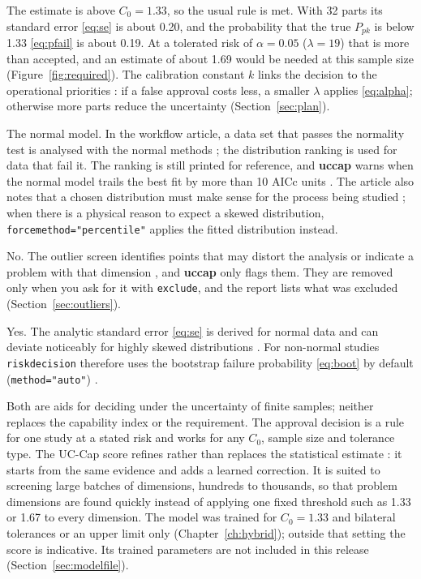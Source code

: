 \documentclass[a4paper,11pt,oneside,openany,parskip=half-,headings=standardclasses,toc=flat,numbers=noenddot]{scrbook}
\newcommand{\code}[1]{\texttt{\begingroup\def\_{\textunderscore\allowbreak}#1\endgroup}}
\newcommand{\pkg}{\textsf{\bfseries uccap}}
\newcommand{\secref}[1]{Section~\ref{#1}}
\newcommand{\chapref}[1]{Chapter~\ref{#1}}
\newcommand{\figref}[1]{Figure~\ref{#1}}
\begin{document}
The estimate is above $C_0 = 1.33$, so the usual rule is met. With 32 parts its standard error \eqref{eq:se} is
about 0.20, and the probability that the true $P_{pk}$ is below 1.33 \eqref{eq:pfail} is about 0.19. At a
tolerated risk of $\alpha = 0.05$ ($\lambda = 19$) that is more than accepted, and an estimate of about 1.69 would be
needed at this sample size (\figref{fig:required}). The calibration constant $k$ links the decision to the
operational priorities \cite[Sec.~7]{jy-risk}: if a false approval costs less, a smaller $\lambda$ applies
\eqref{eq:alpha}; otherwise more parts reduce the uncertainty (\secref{sec:plan}).

The normal model. In the workflow article, a data set that passes the normality test is analysed with the normal
methods \cite[Sec.~2.1]{jy-workflow}; the distribution ranking is used for data that fail it. The ranking is still
printed for reference, and \pkg{} warns when the normal model trails the best fit by more than 10 AICc units
\cite{burnham}. The article also notes that a chosen distribution must make sense for the process being studied
\cite[Sec.~4]{jy-workflow}; when there is a physical reason to expect a skewed distribution,
\code{force\_method="percentile"} applies the fitted distribution instead.

No. The outlier screen identifies points that may distort the analysis or indicate a problem with that dimension
\cite[Sec.~7]{jy-workflow}, and \pkg{} only flags them. They are removed only when you ask for it with
\code{exclude}, and the report lists what was excluded (\secref{sec:outliers}).

Yes. The analytic standard error \eqref{eq:se} is derived for normal data and can deviate noticeably for highly
skewed distributions \cite[Sec.~5.5]{jy-risk}. For non-normal studies \code{risk\_decision} therefore uses the
bootstrap failure probability \eqref{eq:boot} by default (\code{method="auto"}) \cite[App.~B]{jy-risk}.

Both are aids for deciding under the uncertainty of finite samples; neither replaces the capability index or the
requirement. The approval decision is a rule for one study at a stated risk and works for any $C_0$, sample size and
tolerance type. The UC-Cap score refines rather than replaces the statistical estimate \cite[Sec.~6.1]{jy-hybrid}: it
starts from the same evidence and adds a learned correction. It is suited to screening large batches of dimensions, hundreds to thousands, so that problem dimensions are found quickly instead of
applying one fixed threshold such as 1.33 or 1.67 to every dimension. The model was trained for
$C_0 = 1.33$ and bilateral tolerances or an upper limit only (\chapref{ch:hybrid}); outside that setting the score is
indicative. Its trained parameters are not included in this release (\secref{sec:modelfile}).
\end{document}
